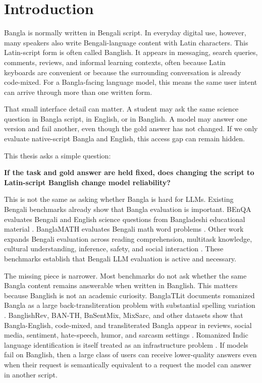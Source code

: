 \chapter{Introduction}

Bangla is normally written in Bengali script. In everyday digital use, however, many speakers also write Bengali-language content with Latin characters. This Latin-script form is often called Banglish. It appears in messaging, search queries, comments, reviews, and informal learning contexts, often because Latin keyboards are convenient or because the surrounding conversation is already code-mixed. For a Bangla-facing language model, this means the same user intent can arrive through more than one written form.

That small interface detail can matter. A student may ask the same science question in Bangla script, in English, or in Banglish. A model may answer one version and fail another, even though the gold answer has not changed. If we only evaluate native-script Bangla and English, this access gap can remain hidden.

This thesis asks a simple question:

\textbf{If the task and gold answer are held fixed, does changing the script to Latin-script Banglish change model reliability?}

This is not the same as asking whether Bangla is hard for LLMs. Existing Bengali benchmarks already show that Bangla evaluation is important. BEnQA evaluates Bengali and English science questions from Bangladeshi educational material \cite{shafayat-etal-2024-benqa}. BanglaMATH evaluates Bengali math word problems \cite{banglamath2025}. Other work expands Bengali evaluation across reading comprehension, multitask knowledge, cultural understanding, inference, safety, and social interaction \cite{banglaquad2024,bnmmlu2025,bluck2025,nctbqa2026,bnli2025,banglasocialbench2026}. These benchmarks establish that Bengali LLM evaluation is active and necessary.

The missing piece is narrower. Most benchmarks do not ask whether the same Bangla content remains answerable when written in Banglish. This matters because Banglish is not an academic curiosity. BanglaTLit documents romanized Bangla as a large back-transliteration problem with substantial spelling variation \cite{fahim-etal-2024-banglatlit}. BanglishRev, BAN-TH, BnSentMix, MixSarc, and other datasets show that Bangla-English, code-mixed, and transliterated Bangla appear in reviews, social media, sentiment, hate-speech, humor, and sarcasm settings \cite{banglishrev2024,banth2024,bnsentmix2024,mixsarc2026}. Romanized Indic language identification is itself treated as an infrastructure problem \cite{bhashaabhijnaanam2023}. If models fail on Banglish, then a large class of users can receive lower-quality answers even when their request is semantically equivalent to a request the model can answer in another script.

